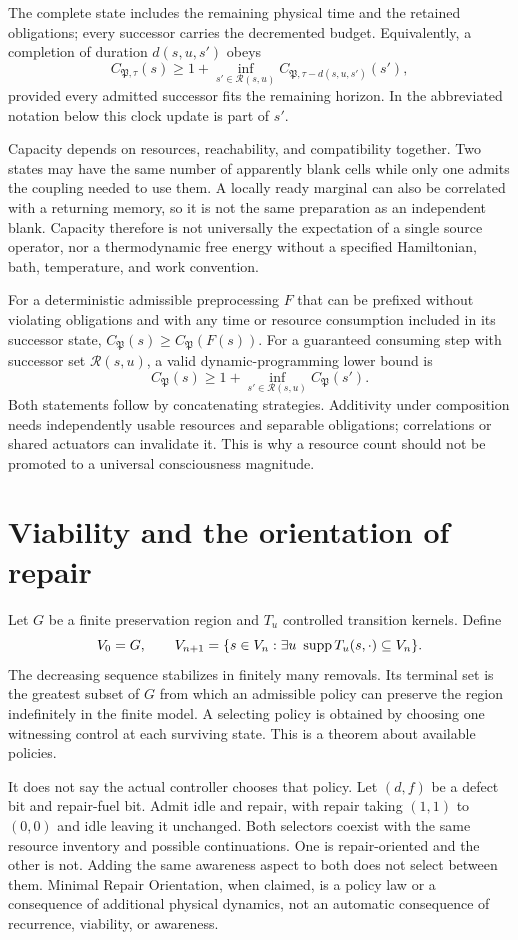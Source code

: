 The complete state includes the remaining physical time and the retained obligations; every successor carries the decremented budget. Equivalently, a completion of duration $d(s,u,s')$ obeys
\[
C_{\mathfrak P,\tau}(s)\ge 1+\inf_{s'\in\mathcal R(s,u)}
C_{\mathfrak P,\tau-d(s,u,s')}(s'),
\]
provided every admitted successor fits the remaining horizon. In the abbreviated notation below this clock update is part of $s'$.

Capacity depends on resources, reachability, and compatibility together. Two states may have the same number of apparently blank cells while only one admits the coupling needed to use them. A locally ready marginal can also be correlated with a returning memory, so it is not the same preparation as an independent blank. Capacity therefore is not universally the expectation of a single source operator, nor a thermodynamic free energy without a specified Hamiltonian, bath, temperature, and work convention.

For a deterministic admissible preprocessing $F$ that can be prefixed without violating obligations and with any time or resource consumption included in its successor state, $C_{\mathfrak P}(s)\ge C_{\mathfrak P}(F(s))$. For a guaranteed consuming step with successor set $\mathcal R(s,u)$, a valid dynamic-programming lower bound is
\[
C_{\mathfrak P}(s)\ge1+\inf_{s'\in\mathcal R(s,u)}C_{\mathfrak P}(s').
\]
Both statements follow by concatenating strategies. Additivity under composition needs independently usable resources and separable obligations; correlations or shared actuators can invalidate it. This is why a resource count should not be promoted to a universal consciousness magnitude.

\section{Viability and the orientation of repair}\label{section:resources:viability-and-the-orientation-of-repair}
Let $G$ be a finite preservation region and $T_u$ controlled transition kernels. Define
\[
V_0=G,\qquad
V_{n+1}=\{s\in V_n:\exists u\ \operatorname{supp} T_u(s,\cdot)\subseteq V_n\}.
\]
The decreasing sequence stabilizes in finitely many removals. Its terminal set is the greatest subset of $G$ from which an admissible policy can preserve the region indefinitely in the finite model. A selecting policy is obtained by choosing one witnessing control at each surviving state. This is a theorem about available policies.

It does not say the actual controller chooses that policy. Let $(d,f)$ be a defect bit and repair-fuel bit. Admit idle and repair, with repair taking $(1,1)$ to $(0,0)$ and idle leaving it unchanged. Both selectors coexist with the same resource inventory and possible continuations. One is repair-oriented and the other is not. Adding the same awareness aspect to both does not select between them. Minimal Repair Orientation, when claimed, is a policy law or a consequence of additional physical dynamics, not an automatic consequence of recurrence, viability, or awareness.

